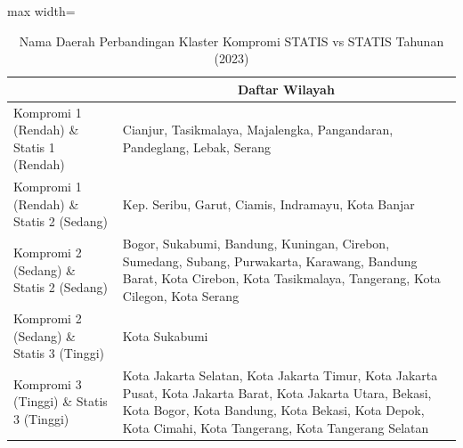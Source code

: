 \begin{table}[H]
\centering
\caption{Nama Daerah Perbandingan Klaster Kompromi STATIS vs STATIS Tahunan (2023)} \label{tab:app1comp_statis_name_2023}
\begin{adjustbox}{max width=\textwidth}
\begin{tabular}{|>{\centering\arraybackslash}p{4cm}|p{10cm}|}
\hline
\multicolumn{1}{|c|}{\textbf{Kategori}} & \multicolumn{1}{c|}{\textbf{Daftar Wilayah}} \\
\hline
Kompromi 1 (Rendah) \& Statis 1 (Rendah) & Cianjur, Tasikmalaya, Majalengka, Pangandaran, Pandeglang, Lebak, Serang \\
\hline
Kompromi 1 (Rendah) \& Statis 2 (Sedang) & Kep. Seribu, Garut, Ciamis, Indramayu, Kota Banjar \\
\hline
Kompromi 2 (Sedang) \& Statis 2 (Sedang) & Bogor, Sukabumi, Bandung, Kuningan, Cirebon, Sumedang, Subang, Purwakarta, Karawang, Bandung Barat, Kota Cirebon, Kota Tasikmalaya, Tangerang, Kota Cilegon, Kota Serang \\
\hline
Kompromi 2 (Sedang) \& Statis 3 (Tinggi) & Kota Sukabumi \\
\hline
Kompromi 3 (Tinggi) \& Statis 3 (Tinggi) & Kota Jakarta Selatan, Kota Jakarta Timur, Kota Jakarta Pusat, Kota Jakarta Barat, Kota Jakarta Utara, Bekasi, Kota Bogor, Kota Bandung, Kota Bekasi, Kota Depok, Kota Cimahi, Kota Tangerang, Kota Tangerang Selatan \\
\hline
\end{tabular}
\end{adjustbox}
\end{table}